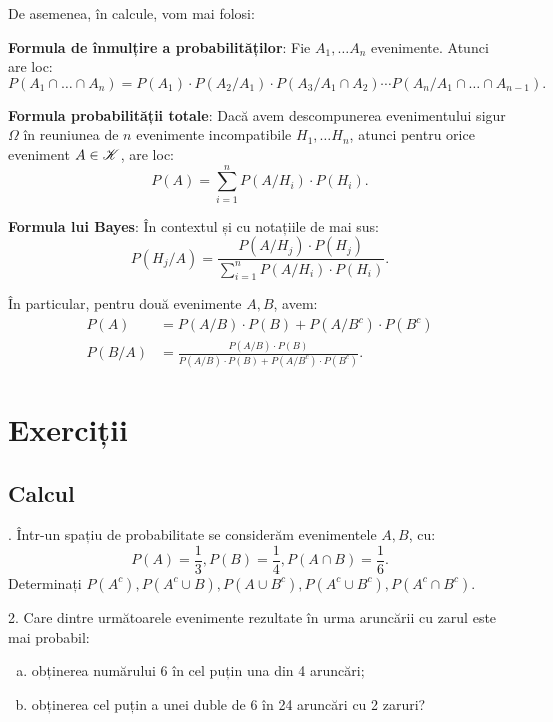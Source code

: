 De asemenea, în calcule, vom mai folosi:

\textbf{Formula de înmulțire a probabilităților}: Fie $ A_1, \dots A_n $ evenimente.
Atunci are loc:
\[
  P(A_1 \cap \dots \cap A_n) = P(A_1) \cdot P(A_2/A_1) \cdot P(A_3/A_1 \cap A_2) \cdots %
  P(A_n/A_1 \cap \dots \cap A_{n-1}).
\]

\vspace{0.3cm}

\textbf{Formula probabilității totale}: Dacă avem descompunerea evenimentului sigur
$ \Omega $ în reuniunea de $ n $ evenimente incompatibile $ H_1, \dots H_n $, atunci
pentru orice eveniment $ A \in \mathscr{K} $, are loc:
\[
  P(A) = \sum_{i = 1}^n P(A/H_i) \cdot P(H_i).
\]

\vspace{0.3cm}

\textbf{Formula lui Bayes}: În contextul și cu notațiile de mai sus:
\[
  P(H_j/A) = \frac{P(A/H_j) \cdot P(H_j)}{\sum_{i = 1}^n P(A/H_i) \cdot P(H_i)}.
\]

În particular, pentru două evenimente $ A, B $, avem:
\begin{align*}
  P(A) &= P(A/B) \cdot P(B) + P(A/B^c)\cdot P(B^c) \\
  P(B/A) &= \frac{P(A/B) \cdot P(B)}{P(A/B) \cdot P(B) + P(A/B^c) \cdot P(B^c)}.
\end{align*}


\section{Exerciții}

\subsection{Calcul }

\indent{}. Într-un spațiu de probabilitate se considerăm evenimentele $ A, B $,
cu:
\[
  P(A) = \frac{1}{3}, P(B) = \frac{1}{4}, P(A \cap B) = \frac{1}{6}.
\]
Determinați $ P(A^c), P(A^c \cup B), P(A \cup B^c), P(A^c \cup B^c), P(A^c \cap B^c) $.

\vspace{0.3cm}

2. Care dintre următoarele evenimente rezultate în urma aruncării cu zarul este mai
probabil:
\begin{enumerate}[(a)]
\item obținerea numărului 6 în cel puțin una din 4 aruncări;
\item obținerea cel puțin a unei duble de 6 în 24 aruncări cu 2 zaruri?
\end{enumerate}

